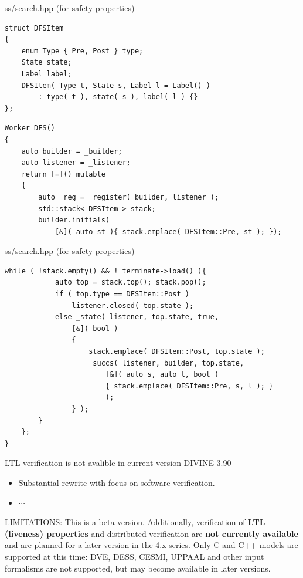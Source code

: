 \documentclass[12pt]{beamer}
\begin{document}
\begin{frame}[fragile]{ss/search.hpp (for safety properties)}
\begin{lstlisting}[basicstyle=\footnotesize\ttfamily]
struct DFSItem
{
    enum Type { Pre, Post } type;
    State state;
    Label label;
    DFSItem( Type t, State s, Label l = Label() )
        : type( t ), state( s ), label( l ) {}
};
\end{lstlisting}
\begin{lstlisting}[basicstyle=\footnotesize\ttfamily]
Worker DFS()
{
    auto builder = _builder;
    auto listener = _listener;
    return [=]() mutable
    {
        auto _reg = _register( builder, listener );
        std::stack< DFSItem > stack;
        builder.initials( 
            [&]( auto st ){ stack.emplace( DFSItem::Pre, st ); });
\end{lstlisting}
\end{frame}

\begin{frame}[fragile]{ss/search.hpp (for safety properties)}
\begin{lstlisting}[basicstyle=\footnotesize\ttfamily]
        while ( !stack.empty() && !_terminate->load() ){
            auto top = stack.top(); stack.pop();
            if ( top.type == DFSItem::Post )
                listener.closed( top.state );
            else _state( listener, top.state, true,
                [&]( bool )
                {
                    stack.emplace( DFSItem::Post, top.state );
                    _succs( listener, builder, top.state,
                        [&]( auto s, auto l, bool )
                        { stack.emplace( DFSItem::Pre, s, l ); }
                        );
                } );
        }
    };
}
\end{lstlisting}
\end{frame}

\begin{frame}{LTL verification is not avalible in current version}
    DIVINE 3.90
    \begin{itemize}
        \item Substantial rewrite with focus on software verification.
        \item $\cdots$
    \end{itemize}
    LIMITATIONS: This is a beta version. Additionally, verification of \textbf{LTL (liveness) properties} and distributed verification are \textbf{not currently available} and are planned for a later version in the 4.x series. Only C and C++ models are supported at this time: DVE, DESS, CESMI, UPPAAL and other input formalisms are not supported, but may become available in later versions.
\end{frame}
\end{document}
